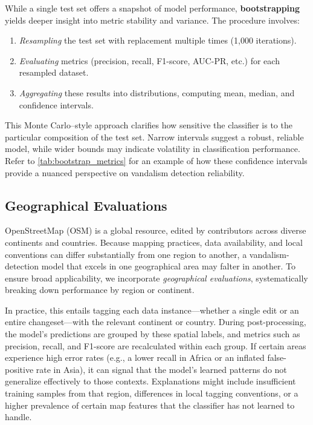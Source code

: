 \documentclass[
    13pt, %
    a4paper, %
    listof=totoc, %
    bibliography=totoc, %
    index=totoc, %
    headsepline
]{scrreprt}
\begin{document}
While a single test set offers a snapshot of model performance, \textbf{bootstrapping}~\cite{bootstrapping} yields deeper insight into metric stability and variance. The procedure involves:
\begin{enumerate}
    \item \emph{Resampling} the test set with replacement multiple times (1,000 iterations).
    \item \emph{Evaluating} metrics (precision, recall, F1-score, AUC-PR, etc.) for each resampled dataset.
    \item \emph{Aggregating} these results into distributions, computing mean, median, and confidence intervals.
\end{enumerate}
This Monte Carlo–style approach clarifies how sensitive the classifier is to the particular composition of the test set. Narrow intervals suggest a robust, reliable model, while wider bounds may indicate volatility in classification performance. Refer to \autoref{tab:bootstrap_metrics} for an example of how these confidence intervals provide a nuanced perspective on vandalism detection reliability.

\subsection{Geographical Evaluations}
\label{sec:geographical_evaluations}

OpenStreetMap (OSM) is a global resource, edited by contributors across diverse continents and countries. Because mapping practices, data availability, and local conventions can differ substantially from one region to another, a vandalism-detection model that excels in one geographical area may falter in another. To ensure broad applicability, we incorporate \emph{geographical evaluations}, systematically breaking down performance by region or continent.

In practice, this entails tagging each data instance—whether a single edit or an entire changeset—with the relevant continent or country. During post-processing, the model’s predictions are grouped by these spatial labels, and metrics such as precision, recall, and F1-score are recalculated within each group. If certain areas experience high error rates (e.g., a lower recall in Africa or an inflated false-positive rate in Asia), it can signal that the model’s learned patterns do not generalize effectively to those contexts. Explanations might include insufficient training samples from that region, differences in local tagging conventions, or a higher prevalence of certain map features that the classifier has not learned to handle.
\end{document}
